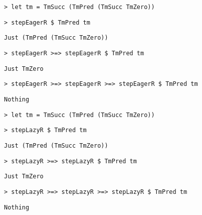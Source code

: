\begin{frame}[fragile]
  \onslide<+->
  \begin{verbatim}
> let tm = TmSucc (TmPred (TmSucc TmZero))
  \end{verbatim}
  \onslide<+->
  \begin{verbatim}
> stepEagerR $ TmPred tm
  \end{verbatim}
  \onslide<+->
  \begin{verbatim}
Just (TmPred (TmSucc TmZero))
  \end{verbatim}
  \onslide<+->
  \begin{verbatim}
> stepEagerR >=> stepEagerR $ TmPred tm
  \end{verbatim}
  \onslide<+->
  \begin{verbatim}
Just TmZero
  \end{verbatim}
  \onslide<+->
  \begin{verbatim}
> stepEagerR >=> stepEagerR >=> stepEagerR $ TmPred tm
  \end{verbatim}
  \onslide<+->
  \begin{verbatim}
Nothing
  \end{verbatim}
\end{frame}

\begin{frame}[fragile]
  \onslide<+->
  \begin{verbatim}
> let tm = TmSucc (TmPred (TmSucc TmZero))
  \end{verbatim}
  \onslide<+->
  \begin{verbatim}
> stepLazyR $ TmPred tm
  \end{verbatim}
  \onslide<+->
  \begin{verbatim}
Just (TmPred (TmSucc TmZero))
  \end{verbatim}
  \onslide<+->
  \begin{verbatim}
> stepLazyR >=> stepLazyR $ TmPred tm
  \end{verbatim}
  \onslide<+->
  \begin{verbatim}
Just TmZero
  \end{verbatim}
  \onslide<+->
  \begin{verbatim}
> stepLazyR >=> stepLazyR >=> stepLazyR $ TmPred tm
  \end{verbatim}
  \onslide<+->
  \begin{verbatim}
Nothing
  \end{verbatim}
\end{frame}
